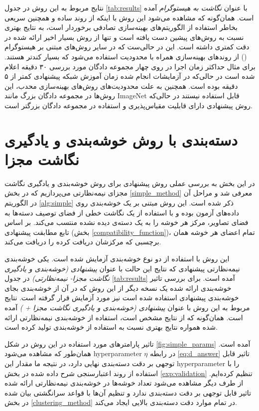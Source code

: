  نتایج مربوط به این روش در جدول 
 \ref{tab:results} 
با عنوان
\textit{نگاشت به هیستوگرام}
آمده است.  همان‌گونه که مشاهده می‌شود این روش با اینکه از روند ساده و همچنین سریعی بخاطر استفاده از الگوریتم‌های بهینه‌سازی تصادفی برخوردار است، به نتایج بهتری نسبت به روش‌های پیشین دست یافته است و تنها از روش بسیار اخیر ارائه شده در \cite{agnostic} دقت کمتری داشته است. این در حالی‌ست که در سایر روش‌های مبتنی بر هیستوگرام (\cite{sse, agnostic}) از روندهای بهینه‌سازی همراه با محدودیت استفاده می‌شود که بسیار کندتر هستند. برای مثال حداکثر زمان اجرا در \cite{sse} روی چهار مجموعه دادگان مورد بررسی ۳۰ دقیقه اعلام شده است در حالی‌که در آزمایشات انجام شده زمان آموزش شبکه پیشنهادی کمتر از ۵ دقیقه بوده است. همچنین به علت محدودیت‌های روش‌های بهینه‌سازی محدب، این روش‌ها در مجموعه دادگان بزرگ مانند ImageNet قابل استفاده نیستند در حالی‌که روش پیشنهادی دارای قابلیت مقیاس‌پذیری و استفاده در مجموعه دادگان بزرگتر است.
\section{دسته‌بندی با روش خوشه‌بندی و یادگیری نگاشت مجزا } \label{exp:simple}
در این بخش به بررسی عملی روش پیشنهادی برای روش خوشه‌بندی و یادگیری نگاشت مجزای نیمه‌نظارتی می‌پردازیم که  در بخش \ref{simple_method} معرفی شد و مراحل آن در الگوریتم \ref{alg:simple} ذکر شده است. این روش مبتنی بر یک خوشه‌بندی روی داده‌های آزمون بوده و با استفاده از یک نگاشت خطی از فضای توصیف دسته‌ها به فضای تصاویر، مرکز هر خوشه را به یک دسته‌ی دیده نشده منتسب می‌کند. بر اساس تابع مطابقت پیشنهادی (بخش \ref{compatibility_function})، تمام اعضای هر خوشه همان برچسبی که مرکزشان دریافت کرده را دریافت می‌کند.

این روش با استفاده از دو نوع خوشه‌بندی آزمایش شده است. یکی خوشه‌بندی نیمه‌نظارتی پیشنهادی که نتایج این حالت با عنوان
\textit{پیشنهادی (خوشه‌بندی و یادگیری نگاشت مجزا- نیمه‌نظارتی) }
در جدول \ref{tab:results} آمده است.
 برای بررسی تاثیر خوشه‌بندی ارائه شده یک نسخه دیگر از این روش که در آن از خوشه‌بندی  بجای خوشه‌بندی پیشنهادی استفاده شده است نیز مورد آزمایش قرار گرفته است. نتایج مربوط به این روش با عنوان
\textit{ پیشنهادی (خوشه‌بندی و یادگیری نگاشت مجزا +  ) }
آمده است.  همان‌گونه که از نتایج مشخص است، استفاده از خوشه‌بندی نیمه‌نظارتی ارائه شده همواره نتایج بهتری نسبت به استفاده از خوشه‌بندی   تولید کرده است.

 تاثیر پارامترهای مورد استفاده در این روش در شکل \ref{fig:simple_params} آمده است. همان‌طور که مشاهده می‌شود \gls{hyperparameter} $\eta$ در رابطه
 \eqref{eq:d_answer}
تاثیر قابل توجهی بر دقت دسته‌بندی نهایی دارد، در نتیجه ما مقدار این \gls{hyperparameter} را با استفاده از روند اعتبارسنجی شرح داده شده در بخش \ref{exp:validation} تنظیم کرده‌ایم. از طرف دیگر مشاهده می‌شود تعداد خوشه‌ها در خوشه‌بندی نیمه‌نظارتی ارائه شده تاثیر قابل توجهی بر دقت دسته‌بندی ندارد و تنظیم آن‌ها با قواعد سرانگشتی بیان شده در بخش  \ref{clustering_method} در تمام موارد دقت دسته‌بندی بالایی ایجاد می‌کند.

